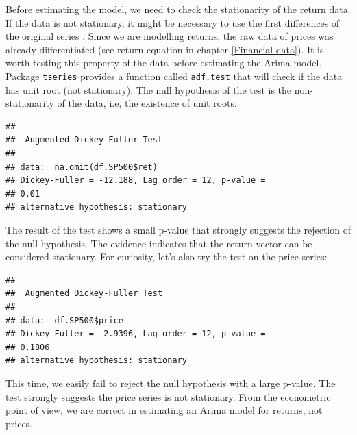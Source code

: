 \documentclass[11pt,]{book}
\newenvironment{Shaded}{\begin{snugshade}}{\end{snugshade}}
\newcommand{\KeywordTok}[1]{\textcolor[rgb]{0.27,0.27,0.27}{\textbf{#1}}}
\newcommand{\OperatorTok}[1]{\textcolor[rgb]{0.81,0.36,0.00}{\textbf{#1}}}
\newcommand{\NormalTok}[1]{#1}
\begin{document}
Before estimating the model, we need to check the stationarity of the
return data. If the data is not stationary, it might be necessary to use
the first differences of the original series
\citep{maddala2001introduction}. Since we are modelling returns, the raw
data of prices was already differentiated (see return equation in
chapter \ref{Financial-data}). It is worth testing this property of the
data before estimating the Arima model. Package \texttt{tseries}
\citep{tseries} provides a function called \texttt{adf.test} that will
check if the data has unit root (not stationary). The null hypothesis of
the test is the non-stationarity of the data, i.e, the existence of unit
roots.  

\begin{Shaded}
\end{Shaded}

\begin{verbatim}
## 
##  Augmented Dickey-Fuller Test
## 
## data:  na.omit(df.SP500$ret)
## Dickey-Fuller = -12.188, Lag order = 12, p-value =
## 0.01
## alternative hypothesis: stationary
\end{verbatim}

The result of the test shows a small p-value that strongly suggests the
rejection of the null hypothesis. The evidence indicates that the return
vector can be considered stationary. For curiosity, let's also try the
test on the price series:

\begin{Shaded}
\end{Shaded}

\begin{verbatim}
## 
##  Augmented Dickey-Fuller Test
## 
## data:  df.SP500$price
## Dickey-Fuller = -2.9396, Lag order = 12, p-value =
## 0.1806
## alternative hypothesis: stationary
\end{verbatim}

This time, we easily fail to reject the null hypothesis with a large
p-value. The test strongly suggests the price series is not stationary.
From the econometric point of view, we are correct in estimating an
Arima model for returns, not prices.
\end{document}

